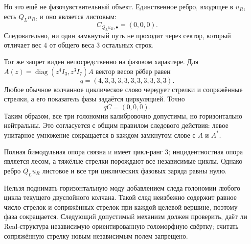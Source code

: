 Но это ещё не фазочувствительный объект. Единственное ребро, входящее в
$u_R$, есть $Q_Lu_R$, и оно является листовым:
\begin{equation}
 C_{Q_Lu_R,\bullet}=(0,0,0).
 \label{eq:v8-heavy-cycle-up-leaf}
\end{equation}
Следовательно, ни один замкнутый путь не проходит через сектор, который
отличает вес $4$ от общего веса $3$ остальных строк.

Тот же запрет виден непосредственно на фазовом характере. Для
$A(z)=\operatorname{diag}(z^4I_3,z^3I_7)A$ вектор весов рёбер равен
\begin{equation}
 q=(4,3,3,3,3,3,3,3,3,3,3).
 \label{eq:v8-heavy-cycle-phase-weights}
\end{equation}
Любое обычное колчанное циклическое слово чередует стрелки и сопряжённые
стрелки, а его показатель фазы задаётся циркуляцией. Точно
\begin{equation}
 qC=(0,0,0).
 \label{eq:v8-heavy-cycle-zero-charge}
\end{equation}
Таким образом, все три голономии калибровочно допустимы, но горизонтально
нейтральны. Это согласуется с общим правилом следового действия: левое
унитарное умножение сокращается в каждом замкнутом слове с $A$ и $A^*$.

\begin{theorem}
Полная бимодульная опора связна и имеет цикл-ранг $3$; инцидентностная опора
является лесом, а тяжёлые стрелки порождают все независимые циклы. Однако
ребро $Q_Lu_R$ листовое и все три циклических фазовых заряда равны нулю.
\end{theorem}

\begin{nogocriterion}
Нельзя поднимать горизонтальную моду добавлением следа голономии любого
цикла текущего двуслойного колчана. Такой след неизбежно содержит равное
число стрелок и сопряжённых стрелок при каждой целевой вершине, поэтому
фаза сокращается. Следующий допустимый механизм должен проверить, даёт ли
Real-структура независимую ориентированную голоморфную свёртку; считать
сопряжённую стрелку новым независимым полем запрещено.
\end{nogocriterion}

